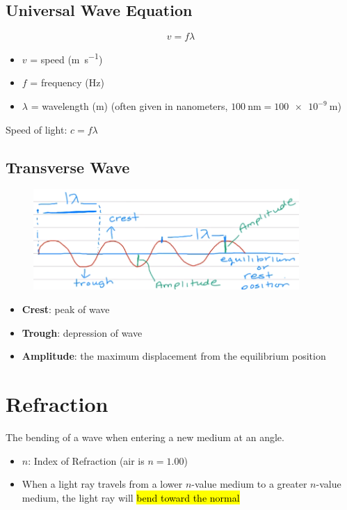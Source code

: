 \documentclass[a4paper,12pt]{article}
\begin{document}
\subsection{Universal Wave Equation}
\Large $$v = f\lambda$$ \normalsize
\begin{itemize}
    \item{$v$ = speed (\si{\m\per\s})}
    \item{$f$ = frequency (\si{\Hz})}
    \item{$\lambda$ = wavelength (\si{\m}) (often given in nanometers, $\SI{100}{\nano\m} = \SI{100e-9}{\m}$)}
\end{itemize}

Speed of light: $c = f\lambda$

\subsection{Transverse Wave}
\begin{figure}[H]
    \centering
    \includegraphics[width=0.9\textwidth]{transverse}
\end{figure}
\begin{itemize}
    \item{\textbf{Crest}: peak of wave}
    \item{\textbf{Trough}: depression of wave}
    \item{\textbf{Amplitude}: the maximum displacement from the equilibrium position}
\end{itemize}

\section{Refraction}
The bending of a wave when entering a new medium at an angle.

\begin{itemize}
    \item{$n$: Index of Refraction (air is $n = \num{1.00}$)}
    \item{When a light ray travels from a lower $n$-value medium to a greater $n$-value medium, the light ray will \hl{bend toward the normal}}
\end{itemize}
\end{document}
